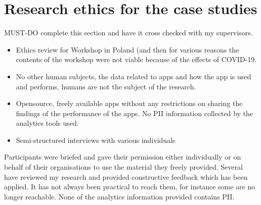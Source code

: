 \section{Research ethics for the case studies}
\label{section-research-ethics-for-the-case-studies}

MUST-DO complete this section and have it cross checked with my supervisors.

\begin{itemize}
    \item Ethics review for Workshop in Poland (and then for various reasons the contents of the workshop were not viable because of the effects of COVID-19.
    \item No other human subjects, the data related to apps and how the app is used and performs, humans are not the subject of the research.
    \item Opensource, freely available apps without any restrictions on sharing the findings of the performance of the apps. No PII information collected by the analytics tools used.
    \item Semi-structured interviews with various individuals 
\end{itemize}

Participants were briefed and gave their permission either individually or on behalf of their organisations to use the material they freely provided. Several have reviewed my research and provided constructive feedback which has been applied. It has not always been practical to reach them, for instance some are no longer reachable. None of the analytics information provided contains PII. 
\clearpage



\clearpage


\clearpage


\clearpage


\clearpage


\clearpage



\clearpage



\clearpage


\clearpage